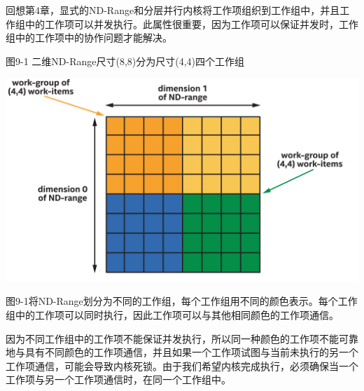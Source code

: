 回想第4章，显式的ND-Range和分层并行内核将工作项组织到工作组中，并且工作组中的工作项可以并发执行。此属性很重要，因为工作项可以保证并发时，工作组中的工作项中的协作问题才能解决。\par

\hspace*{\fill} \par %
图9-1 二维ND-Range尺寸(8,8)分为尺寸(4,4)四个工作组
\begin{center}
	\includegraphics[width=1.\textwidth]{content/chapter-9/images/2}
\end{center}

图9-1将ND-Range划分为不同的工作组，每个工作组用不同的颜色表示。每个工作组中的工作项可以同时执行，因此工作项可以与其他相同颜色的工作项通信。\par

因为不同工作组中的工作项不能保证并发执行，所以同一种颜色的工作项不能可靠地与具有不同颜色的工作项通信，并且如果一个工作项试图与当前未执行的另一个工作项通信，可能会导致内核死锁。由于我们希望内核完成执行，必须确保当一个工作项与另一个工作项通信时，在同一个工作组中。\par















































